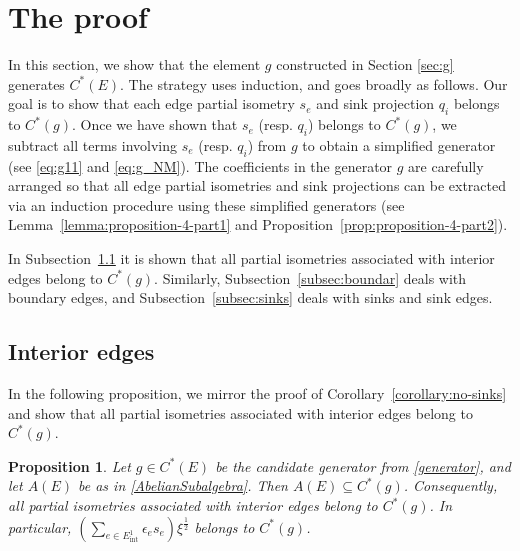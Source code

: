 \documentclass[12pt, a4paper]
{amsart}
\newtheorem{prop}[thm]{Proposition}
\theoremstyle{definition}
\theoremstyle{remark}
\numberwithin{equation}{section}
\newcommand{\edgeint}{E^1_{\mathrm{int}}}
\newcommand{\Cstar}{\ensuremath{C^*}}
\begin{document}
\section{The proof}
\label{sec:proof}
In this section, we show that the element $g$ constructed in Section \ref{sec:g} generates $\Cstar(E)$. The strategy uses induction, and goes broadly as follows. Our goal is to show that each edge partial isometry $s_e$ and sink projection $q_i$ belongs to $\Cstar(g)$. Once we have shown that $s_e$ (resp. $q_i$) belongs to $\Cstar(g)$, we subtract all terms involving $s_e$ (resp. $q_i$) from $g$ to obtain a simplified generator (see \eqref{eq:g11} and \eqref{eq:g_NM}). The coefficients in the generator $g$ are carefully arranged so that all edge partial isometries and sink projections can be extracted via an induction procedure using these simplified generators (see Lemma~\ref{lemma:proposition-4-part1} and Proposition~\ref{prop:proposition-4-part2}).

In Subsection~\ref{subsec:interior} it is shown that all partial isometries associated with interior edges belong to $\Cstar(g)$. Similarly, Subsection~\ref{subsec:boundar} deals with boundary edges, and Subsection~\ref{subsec:sinks} deals with sinks and sink edges.

\subsection{Interior edges}
\label{subsec:interior}

In the following proposition, we mirror the proof of Corollary~\ref{corollary:no-sinks} and show that all partial isometries associated with interior edges belong to $\Cstar(g)$.

\begin{prop}
\label{proposition:interior-edges}
     Let $g \in C^*(E)$ be the candidate generator from \eqref{generator}, and let $A(E)$ be as in \eqref{AbelianSubalgebra}. Then $A(E) \subseteq C^*(g)$. Consequently, all partial isometries associated with interior edges belong to $\Cstar(g)$. In particular, $\left( \sum_{e \in \edgeint} \epsilon_e s_e \right)\xi^{\frac{1}{2}}$ belongs to $\Cstar(g)$.
\end{prop}
\end{document}

